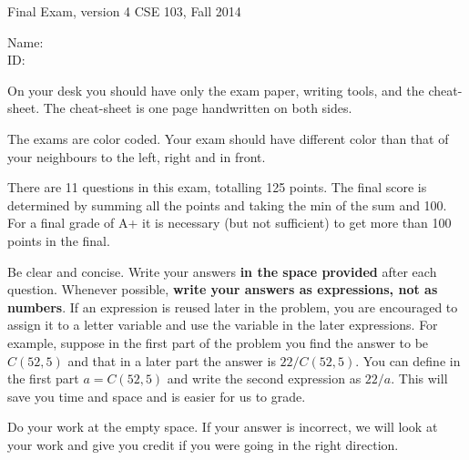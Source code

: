 \documentclass[10pt,dvips]{amsart}
\begin{document}
\voffset=-0.8in
\newpage
{\textbf \Large Final Exam, version 4} \hfill CSE 103, Fall 2014
\\

\vspace{.25in}

Name: \underline{\hspace{3in}}
\\

ID: \underline{\hspace{3.2in}}
\\

\vspace{0.5in}

On your desk you should have only the exam paper, writing tools, and
the cheat-sheet. The cheat-sheet is one page handwritten on both sides.

The exams are color coded. Your exam should have different color 
than that of your neighbours to the left, right and in front.

There are 11 questions in this exam, totalling 125 points.  The final
score is determined by summing all the points and taking the min of
the sum and 100. For a final grade of A+ it is necessary (but not
sufficient) to get more than 100 points in the final. 

Be clear and concise. Write your answers {\bf in the space provided}
after each question. Whenever possible, {\bf write your answers
as expressions, not as numbers}. If an expression is reused
later in the problem, you are encouraged to assign it to a letter
variable and use the variable in the later expressions. For example,
suppose in the first part of the problem you find the answer to be
$C(52,5)$ and that in a later part the answer is $22/C(52,5)$. You can
define in the first part $a=C(52,5)$ and write the second expression
as $22/a$. This will save you time and space and is easier for us to
grade.

Do your work at the empty space. If your answer is incorrect, we will
look at your work and give you credit if you were going in the right direction.

\vspace{0.2in}
\end{document}

